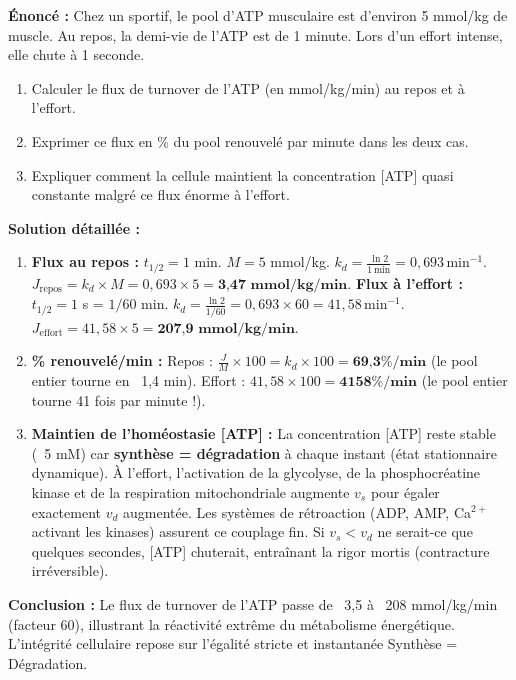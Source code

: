 \documentclass[11pt]{article}
\begin{document}
\begin{exoresolu}
\textbf{Énoncé :} Chez un sportif, le pool d'ATP musculaire est d'environ 5 mmol/kg de muscle. Au repos, la demi-vie de l'ATP est de 1 minute. Lors d'un effort intense, elle chute à 1 seconde.
\begin{enumerate}
    \item Calculer le flux de turnover de l'ATP (en mmol/kg/min) au repos et à l'effort.
    \item Exprimer ce flux en \% du pool renouvelé par minute dans les deux cas.
    \item Expliquer comment la cellule maintient la concentration [ATP] quasi constante malgré ce flux énorme à l'effort.
\end{enumerate}
\tcblower
\textbf{Solution détaillée :}
\begin{enumerate}
    \item \textbf{Flux au repos :} $t_{1/2} = 1$ min. $M = 5$ mmol/kg.
    $k_d = \frac{\ln 2}{1\,\text{min}} = 0{,}693\,\text{min}^{-1}$.
    $J_{\text{repos}} = k_d \times M = 0{,}693 \times 5 = \textbf{3{,}47 mmol/kg/min}$.
    \textbf{Flux à l'effort :} $t_{1/2} = 1$ s = $1/60$ min.
    $k_d = \frac{\ln 2}{1/60} = 0{,}693 \times 60 = 41{,}58\,\text{min}^{-1}$.
    $J_{\text{effort}} = 41{,}58 \times 5 = \textbf{207{,}9 mmol/kg/min}$.
    \item \textbf{\% renouvelé/min :}
    Repos : $\frac{J}{M} \times 100 = k_d \times 100 = \textbf{69{,}3\%/min}$ (le pool entier tourne en ~1,4 min).
    Effort : $41{,}58 \times 100 = \textbf{4158\%/min}$ (le pool entier tourne 41 fois par minute !).
    \item \textbf{Maintien de l'homéostasie [ATP] :} La concentration [ATP] reste stable (~5 mM) car \textbf{synthèse = dégradation} à chaque instant (état stationnaire dynamique). À l'effort, l'activation de la glycolyse, de la phosphocréatine kinase et de la respiration mitochondriale augmente $v_s$ pour égaler exactement $v_d$ augmentée. Les systèmes de rétroaction (ADP, AMP, Ca$^{2+}$ activant les kinases) assurent ce couplage fin. Si $v_s < v_d$ ne serait-ce que quelques secondes, [ATP] chuterait, entraînant la rigor mortis (contracture irréversible).
\end{enumerate}
\textbf{Conclusion :} Le flux de turnover de l'ATP passe de ~3,5 à ~208 mmol/kg/min (facteur 60), illustrant la réactivité extrême du métabolisme énergétique. L'intégrité cellulaire repose sur l'égalité stricte et instantanée Synthèse = Dégradation.
\end{exoresolu}
\end{document}
